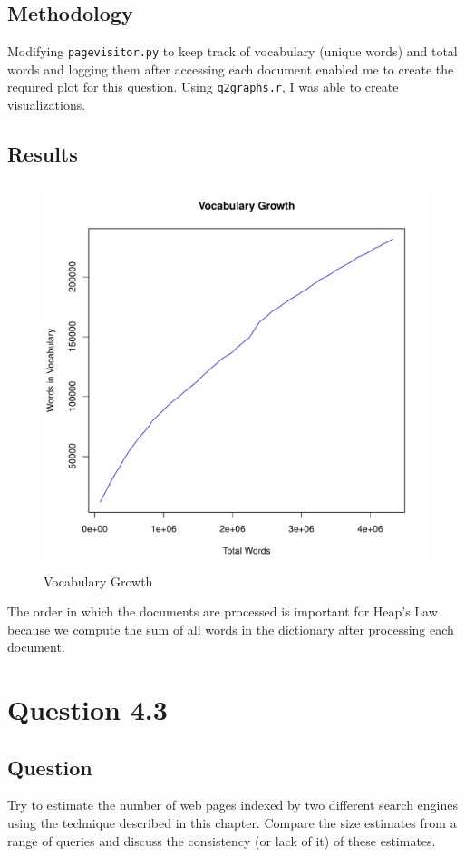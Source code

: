 \documentclass[10pt,letterpaper,bibliography=totoc]{scrartcl}
\begin{document}
\subsection{Methodology}
Modifying \texttt{pagevisitor.py} to keep track of vocabulary (unique words) and total words and logging them after accessing each document enabled me to create the required plot for this question. Using \texttt{q2graphs.r}, I was able to create visualizations. 

\subsection{Results}
\begin{figure}[h!]
\centering
\label{fig:vocab}
\includegraphics[scale=.5]{vocabulary.pdf}
\caption{Vocabulary Growth}
\end{figure}

The order in which the documents are processed is important for Heap's Law because we compute the sum of all words in the dictionary after processing each document. 
\clearpage

\section{Question 4.3}
\subsection {Question}
Try to estimate the number of web pages indexed by two different search engines
using the technique described in this chapter. Compare the size estimates
from a range of queries and discuss the consistency (or lack of it) of these estimates.
\end{document}
